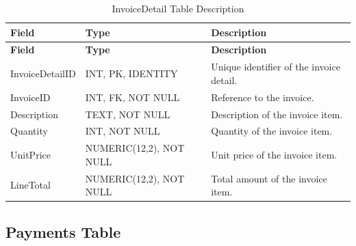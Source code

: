 \begin{longtable}{
		|>{\raggedright\arraybackslash}p{3.2cm}|
		>{\raggedright\arraybackslash}p{4.2cm}|
		>{\raggedright\arraybackslash}p{5.0cm}|
	}
	\caption{InvoiceDetail Table Description}
	\label{tab:invoice-detail}\\
	\hline
	\textbf{Field} & \textbf{Type} & \textbf{Description} \\ \hline
	\endfirsthead
	\hline
	\textbf{Field} & \textbf{Type} & \textbf{Description} \\ \hline
	\endhead
	
	InvoiceDetailID & INT, PK, IDENTITY &
	Unique identifier of the invoice detail. \\ \hline
	
	InvoiceID & INT, FK, NOT NULL &
	Reference to the invoice. \\ \hline
	
	Description & TEXT, NOT NULL &
	Description of the invoice item. \\ \hline
	
	Quantity & INT, NOT NULL &
	Quantity of the invoice item. \\ \hline
	
	UnitPrice & NUMERIC(12,2), NOT NULL &
	Unit price of the invoice item. \\ \hline
	
	LineTotal & NUMERIC(12,2), NOT NULL &
	Total amount of the invoice item. \\ \hline
	
\end{longtable}


\subsection{Payments Table}

